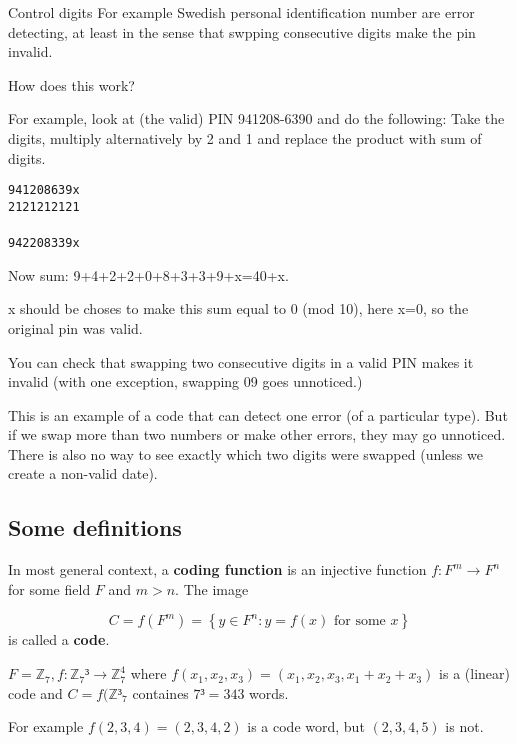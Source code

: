 \documentclass[english]{lbscript}
\begin{document}
\begin{example}{Control digits}{}
  For example Swedish personal identification number are error detecting, at least in the sense that swpping consecutive digits make the pin invalid.

  How does this work?

  For example, look at (the valid) PIN 941208-6390 and do the following:
  Take the digits, multiply alternatively by 2 and 1 and replace the product with sum of digits.

  \texttt{941208639x}\\
  \texttt{2121212121}\\\\
  \texttt{942208339x}

  Now sum: 9+4+2+2+0+8+3+3+9+x=40+x.

  x should be choses to make this sum equal to 0 (mod 10), here x=0, so the original pin was valid.

  You can check that swapping two consecutive digits in a valid PIN makes it invalid (with one exception, swapping 09 goes unnoticed.)

  This is an example of a code that can detect one error (of a particular type). But if we swap more than two numbers or make other errors, they may go unnoticed. There is also no way to see exactly which two digits were swapped (unless we create a non-valid date).
\end{example}

\subsection{Some definitions}
\label{sec:some-definitions}

\begin{definition}{}{}
  In most general context, a \textbf{coding function} is an injective function \(f:F^{m}→F^{n}\) for some field \(F\) and \(m>n\). The image

  \begin{equation}
    \label{eq:130}
    C=f(F^{m}) = \left\{ y∈F^{n}: y=f(x) \text{ for some } x \right\}
  \end{equation}
  is called a \textbf{code}.
\end{definition}

\begin{example}{}{}
  \(F=ℤ_{7}, f: ℤ_{7}³→ℤ_{7}^{4}\) where \(f(x_1,x_2,x_3)=(x_1,x_2,x_3,x_1+x_2+x_3)\) is a (linear) code and \(C=f(ℤ³_{7}\) containes \(7³=343\) words.

  For example \(f(2,3,4)=(2,3,4,2)\) is a code word, but \((2,3,4,5)\) is not.
\end{example}
\end{document}
